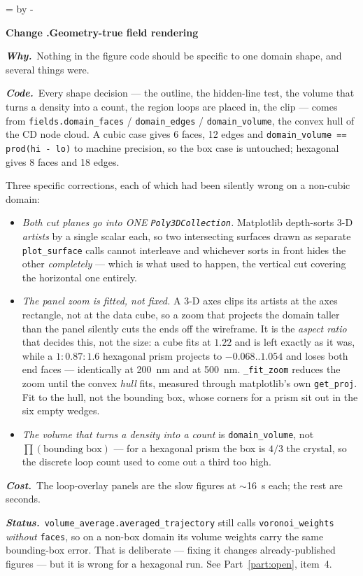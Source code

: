 \documentclass[11pt,a4paper]{article}
\newcommand{\code}[1]{\texttt{\small #1}}
\newcommand{\needlines}[1]{%
  \par\dimen0=\pagegoal \advance\dimen0 by -\pagetotal
  \ifdim\dimen0<#1\baselineskip \newpage \fi}
\newcounter{chg}
\newcommand{\change}[1]{%
  \needlines{4}%
  \refstepcounter{chg}%
  \par\medskip\noindent
  {\bfseries\boldmath Change \thechg.\quad #1}%
  \par\nobreak\smallskip}
\newcommand{\why}[1]{\par\noindent\textbf{\itshape Why.}\ #1\par}
\newcommand{\impact}[1]{\par\noindent\textbf{\itshape Code.}\ #1\par}
\newcommand{\cost}[1]{\par\noindent\textbf{\itshape Cost.}\ #1\par}
\newcommand{\status}[1]{\par\noindent\textbf{\itshape Status.}\ #1\par}
\begin{document}
\change{Geometry-true field rendering}
\label{chg:figures}
\why{Nothing in the figure code should be specific to one domain shape, and
several things were.}
\impact{Every shape decision --- the outline, the hidden-line test, the volume
that turns a density into a count, the region loops are placed in, the clip ---
comes from \code{fields.domain\_faces} / \code{domain\_edges} /
\code{domain\_volume}, the convex hull of the CD node cloud. A cubic case gives
6 faces, 12 edges and \code{domain\_volume == prod(hi - lo)} to machine
precision, so the box case is untouched; hexagonal gives 8 faces and 18 edges.

Three specific corrections, each of which had been silently wrong on a
non-cubic domain:

\begin{itemize}\itemsep2pt
\item \emph{Both cut planes go into ONE \code{Poly3DCollection}.} Matplotlib
  depth-sorts 3-D \emph{artists} by a single scalar each, so two intersecting
  surfaces drawn as separate \code{plot\_surface} calls cannot interleave and
  whichever sorts in front hides the other \emph{completely} --- which is what
  used to happen, the vertical cut covering the horizontal one entirely.
\item \emph{The panel zoom is fitted, not fixed.} A 3-D axes clips its artists
  at the axes rectangle, not at the data cube, so a zoom that projects the
  domain taller than the panel silently cuts the ends off the wireframe. It is
  the \emph{aspect ratio} that decides this, not the size: a cube fits at
  $1.22$ and is left exactly as it was, while a $1:0.87:1.6$ hexagonal prism
  projects to $-0.068..1.054$ and loses both end faces --- identically at
  200~nm and at 500~nm. \code{\_fit\_zoom} reduces the zoom until the convex
  \emph{hull} fits, measured through matplotlib's own \code{get\_proj}. Fit to
  the hull, not the bounding box, whose corners for a prism sit out in the six
  empty wedges.
\item \emph{The volume that turns a density into a count} is
  \code{domain\_volume}, not $\prod(\text{bounding box})$ --- for a hexagonal
  prism the box is $4/3$ the crystal, so the discrete loop count used to come
  out a third too high.
\end{itemize}}
\cost{The loop-overlay panels are the slow figures at $\sim$16~s each; the rest
are seconds.}
\status{\code{volume\_average.averaged\_trajectory} still calls
\code{voronoi\_weights} \emph{without} \code{faces}, so on a non-box domain its
volume weights carry the same bounding-box error. That is deliberate --- fixing
it changes already-published figures --- but it is wrong for a hexagonal run.
See Part~\ref{part:open}, item~4.}
\end{document}
